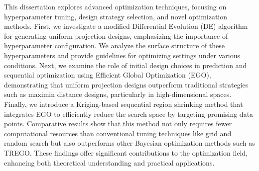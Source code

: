 
This dissertation explores advanced optimization techniques, focusing on hyperparameter tuning, design strategy selection, and novel optimization methods. First, we investigate a modified Differential Evolution (DE) algorithm for generating uniform projection designs, emphasizing the importance of hyperparameter configuration. We analyze the surface structure of these hyperparameters and provide guidelines for optimizing settings under various conditions. Next, we examine the role of initial design choices in prediction and sequential optimization using Efficient Global Optimization (EGO), demonstrating that uniform projection designs outperform traditional strategies such as maximin distance designs, particularly in high-dimensional spaces. Finally, we introduce a Kriging-based sequential region shrinking method that integrates EGO to efficiently reduce the search space by targeting promising data points. Comparative results show that this method not only requires fewer computational resources than conventional tuning techniques like grid and random search but also outperforms other Bayesian optimization methods such as TREGO. These findings offer significant contributions to the optimization field, enhancing both theoretical understanding and practical applications.






